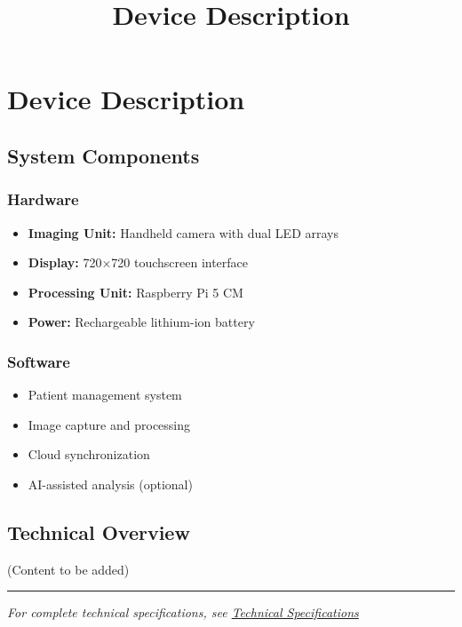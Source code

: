 \documentclass[
  letterpaper,
]{article}
\title{Device Description}
\author{}
\date{}
\providecommand{\tightlist}{%
  \setlength{\itemsep}{0pt}\setlength{\parskip}{0pt}}
\renewcommand*\contentsname{Table of contents}
\newcommand\contentsname{Table of contents}
\begin{document}
\maketitle

\renewcommand*\contentsname{Table of contents}
{
\hypersetup{linkcolor=}
\setcounter{tocdepth}{3}
\tableofcontents
}

\section{Device Description}\label{device-description}

\subsection{System Components}\label{system-components}

\subsubsection{Hardware}\label{hardware}

\begin{itemize}
\tightlist
\item
  \textbf{Imaging Unit:} Handheld camera with dual LED arrays
\item
  \textbf{Display:} 720×720 touchscreen interface
\item
  \textbf{Processing Unit:} Raspberry Pi 5 CM
\item
  \textbf{Power:} Rechargeable lithium-ion battery
\end{itemize}

\subsubsection{Software}\label{software}

\begin{itemize}
\tightlist
\item
  Patient management system
\item
  Image capture and processing
\item
  Cloud synchronization
\item
  AI-assisted analysis (optional)
\end{itemize}

\subsection{Technical Overview}\label{technical-overview}

(Content to be added)

\begin{center}\rule{0.5\linewidth}{0.5pt}\end{center}

\emph{For complete technical specifications, see
\href{technical-specs.qmd}{Technical Specifications}}
\end{document}
